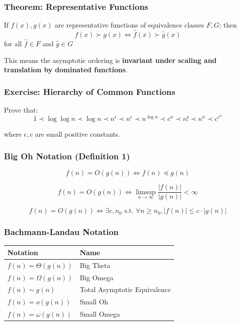 \documentclass{beamer}
\begin{document}
\begin{frame}
  \frametitle{Theorem: Representative Functions}
  
  \begin{theorem}
    If $f(x), g(x)$ are representative functions of equivalence classes $F, G$; then 
    $$f(x) \succ g(x) \iff \hat{f}(x) \succ \hat{g}(x)$$ 
    for all $\hat{f} \in F$ and $\hat{g} \in G$
  \end{theorem}
  
  \vspace{0.3cm}
  
  This means the asymptotic ordering is \textbf{invariant under scaling and translation by dominated functions}.
\end{frame}

\begin{frame}
  \frametitle{Exercise: Hierarchy of Common Functions}
  
  Prove that:
  $$1 \prec \log \log n \prec \log n \prec n^\epsilon \prec n^c \prec n^{\log n} \prec c^n \prec n! \prec n^n \prec c^{c^n}$$
  
  where $\epsilon, c$ are small positive constants.
\end{frame}

\begin{frame}
  \frametitle{Big Oh Notation (Definition 1)}
  
  \begin{definition}
    $$f(n) = O(g(n)) \iff f(n) \preceq g(n)$$
  \end{definition}
  
  \begin{definition}
    $$f(n) = O(g(n)) \iff \limsup_{n \to \infty} \frac{|f(n)|}{|g(n)|} < \infty$$
  \end{definition}
  
  \begin{definition}
    $$f(n) = O(g(n)) \iff \exists c, n_0 \text{ s.t. } \forall n \geq n_0, |f(n)| \leq c \cdot |g(n)|$$
  \end{definition}
\end{frame}

\begin{frame}
  \frametitle{Bachmann-Landau Notation}
  
  \begin{center}
    \begin{tabular}{|l|l|}
      \hline
      \textbf{Notation} & \textbf{Name} \\
      \hline
      $f(n) = \Theta(g(n))$ & Big Theta \\
      $f(n) = \Omega(g(n))$ & Big Omega \\
      $f(n) \sim g(n)$ & Total Asymptotic Equivalence \\
      $f(n) = o(g(n))$ & Small Oh \\
      $f(n) = \omega(g(n))$ & Small Omega \\
      \hline
    \end{tabular}
  \end{center}
\end{frame}
\end{document}
